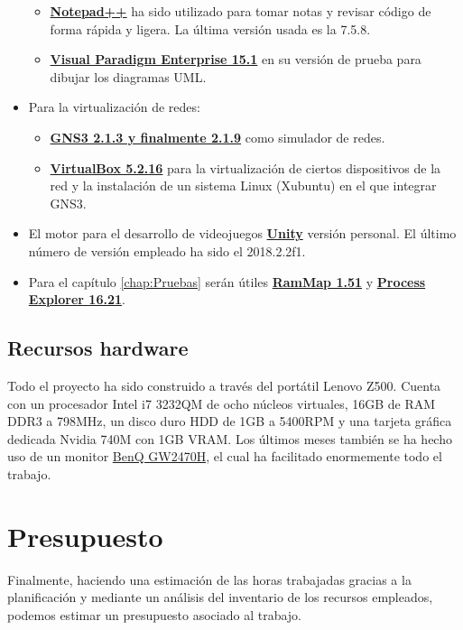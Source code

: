 \begin{itemize}
\begin{itemize}
\item \href{https://notepad-plus-plus.org/}{\textbf{Notepad++}} ha sido utilizado para tomar notas y revisar código de forma rápida y ligera. La última versión usada es la 7.5.8.
\item \href{https://www.visual-paradigm.com/}{\textbf{Visual Paradigm Enterprise 15.1}} en su versión de prueba para dibujar los diagramas UML.
\end{itemize}
\item Para la virtualización de redes:
\begin{itemize}
\item \href{https://www.gns3.com/}{\textbf{GNS3 2.1.3 y finalmente 2.1.9}} como simulador de redes.
\item \href{https://www.virtualbox.org/}{\textbf{VirtualBox 5.2.16}} para la virtualización de ciertos dispositivos de la red y la instalación de un sistema Linux (Xubuntu) en el que integrar GNS3.
\end{itemize}
\item El motor para el desarrollo de videojuegos \href{https://unity3d.com/es}{\textbf{Unity}} versión personal. El último número de versión empleado ha sido el 2018.2.2f1.
\item Para el capítulo \ref{chap:Pruebas} serán útiles \href{https://docs.microsoft.com/en-us/sysinternals/downloads/rammap}{\textbf{RamMap 1.51}} y \href{https://docs.microsoft.com/en-us/sysinternals/downloads/process-explorer}{\textbf{Process Explorer 16.21}}.
\end{itemize}

\subsection{Recursos hardware}\label{sec:hardware}
Todo el proyecto ha sido construido a través del portátil Lenovo Z500. Cuenta con un procesador Intel i7 3232QM de ocho núcleos virtuales, 16GB de RAM DDR3 a 798MHz, un disco duro HDD de 1GB a 5400RPM y una tarjeta gráfica dedicada Nvidia 740M con 1GB VRAM. Los últimos meses también se ha hecho uso de un monitor \href{https://www.benq.es/product/monitor/gw2470h/}{BenQ GW2470H}, el cual ha facilitado enormemente todo el trabajo.

\section{Presupuesto}
Finalmente, haciendo una estimación de las horas trabajadas gracias a la planificación y mediante un análisis del inventario de los recursos empleados, podemos estimar un presupuesto asociado al trabajo.

